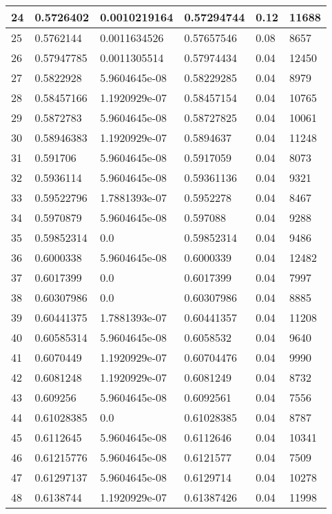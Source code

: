 \begin{longtable}{|l|l|l|l|l|l|}
24 & 0.5726402 & 0.0010219164 & 0.57294744 & 0.12 & 11688 \\ \hline 
25 & 0.5762144 & 0.0011634526 & 0.57657546 & 0.08 & 8657 \\ \hline 
26 & 0.57947785 & 0.0011305514 & 0.57974434 & 0.04 & 12450 \\ \hline 
27 & 0.5822928 & 5.9604645e-08 & 0.58229285 & 0.04 & 8979 \\ \hline 
28 & 0.58457166 & 1.1920929e-07 & 0.58457154 & 0.04 & 10765 \\ \hline 
29 & 0.5872783 & 5.9604645e-08 & 0.58727825 & 0.04 & 10061 \\ \hline 
30 & 0.58946383 & 1.1920929e-07 & 0.5894637 & 0.04 & 11248 \\ \hline 
31 & 0.591706 & 5.9604645e-08 & 0.5917059 & 0.04 & 8073 \\ \hline 
32 & 0.5936114 & 5.9604645e-08 & 0.59361136 & 0.04 & 9321 \\ \hline 
33 & 0.59522796 & 1.7881393e-07 & 0.5952278 & 0.04 & 8467 \\ \hline 
34 & 0.5970879 & 5.9604645e-08 & 0.597088 & 0.04 & 9288 \\ \hline 
35 & 0.59852314 & 0.0 & 0.59852314 & 0.04 & 9486 \\ \hline 
36 & 0.6000338 & 5.9604645e-08 & 0.6000339 & 0.04 & 12482 \\ \hline 
37 & 0.6017399 & 0.0 & 0.6017399 & 0.04 & 7997 \\ \hline 
38 & 0.60307986 & 0.0 & 0.60307986 & 0.04 & 8885 \\ \hline 
39 & 0.60441375 & 1.7881393e-07 & 0.60441357 & 0.04 & 11208 \\ \hline 
40 & 0.60585314 & 5.9604645e-08 & 0.6058532 & 0.04 & 9640 \\ \hline 
41 & 0.6070449 & 1.1920929e-07 & 0.60704476 & 0.04 & 9990 \\ \hline 
42 & 0.6081248 & 1.1920929e-07 & 0.6081249 & 0.04 & 8732 \\ \hline 
43 & 0.609256 & 5.9604645e-08 & 0.6092561 & 0.04 & 7556 \\ \hline 
44 & 0.61028385 & 0.0 & 0.61028385 & 0.04 & 8787 \\ \hline 
45 & 0.6112645 & 5.9604645e-08 & 0.6112646 & 0.04 & 10341 \\ \hline 
46 & 0.61215776 & 5.9604645e-08 & 0.6121577 & 0.04 & 7509 \\ \hline 
47 & 0.61297137 & 5.9604645e-08 & 0.6129714 & 0.04 & 10278 \\ \hline 
48 & 0.6138744 & 1.1920929e-07 & 0.61387426 & 0.04 & 11998 \\ \hline 

\end{longtable}
